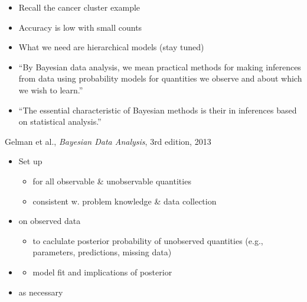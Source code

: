 \documentclass[10pt]{report}
\begin{document}
\begin{itemize}
\item Recall the cancer cluster example
\item Accuracy is low with small counts
\item What we need are hierarchical models (stay tuned)
\end{itemize}


\begin{itemize}
\item ``By {Bayesian data analysis}, we mean {practical methods}
  for making {inferences} from {data} using {probability models}
  for quantities we {observe} and about which we {wish to learn}.''
\item ``The essential characteristic of Bayesian methods is
  their 
  in inferences based on statistical analysis.''
\end{itemize}
% 
\vfill\hfill{\footnotesize Gelman et al., {\slshape Bayesian Data Analysis},
  3rd edition, 2013}

% 
\begin{itemize}
\item Set up 
  \vspace*{-4pt}
  \begin{itemize}
  \item for all observable \& unobservable quantities
  \item consistent w. problem knowledge \& data collection
  \end{itemize}
\item {} on observed data
  \vspace*{-4pt}
  \begin{itemize}
  \item to caclulate posterior probability of unobserved quantities
    (e.g., parameters, predictions, missing data)
  \end{itemize}
\item {}
  \vspace*{-4pt}
  \begin{itemize}
  \item model fit and implications of posterior
  \end{itemize}
\vfill
\item {} as necessary
\end{itemize}
\end{document}
